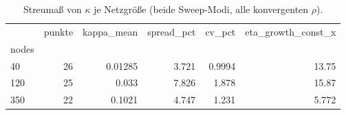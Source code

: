 \begin{table}[htbp]
\centering
\caption{Streuma\ss{} von $\kappa$ je Netzgr\"o\ss e (beide Sweep-Modi, alle konvergenten $\rho$).}
\label{tab:rx-collapse}
\begin{tabular}{lrrrrr}
\toprule
 & punkte & kappa_mean & spread_pct & cv_pct & eta_growth_const_x \\
nodes &  &  &  &  &  \\
\midrule
40 & 26 & 0.01285 & 3.721 & 0.9994 & 13.75 \\
120 & 25 & 0.033 & 7.826 & 1.878 & 15.87 \\
350 & 22 & 0.1021 & 4.747 & 1.231 & 5.772 \\
\bottomrule
\end{tabular}
\end{table}
